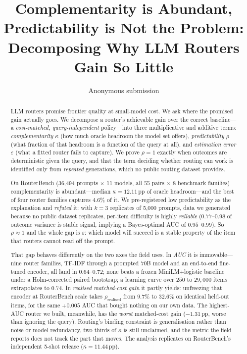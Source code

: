\documentclass[10pt]{article}
\title{\bf Complementarity is Abundant, Predictability is Not the Problem:\\
Decomposing Why LLM Routers Gain So Little}
\author{Anonymous submission}
\date{}
\newcommand{\pp}{\,\text{pp}}
\begin{document}
\maketitle

\begin{abstract}
LLM routers promise frontier quality at small-model cost. We ask where the
promised gain actually goes. We decompose a router's achievable gain over the
correct baseline---a \emph{cost-matched, query-independent} policy---into three
multiplicative and additive terms: \emph{complementarity} $\kappa$ (how much
oracle headroom the model set offers), \emph{predictability} $\rho$ (what
fraction of that headroom is a function of the query at all), and
\emph{estimation error} $\varepsilon$ (what a fitted router fails to capture).
We prove $\rho=1$ exactly when outcomes are deterministic given the query, and
that the term deciding whether routing can work is identified only from
\emph{repeated} generations, which no public routing dataset provides.

On RouterBench (36{,}494 prompts $\times$ 11 models, all 55 pairs $\times$ 8
benchmark families) complementarity is abundant---median $\kappa = 12.11\pp$ of
oracle headroom---and the best of four router families captures $4.6\%$ of it.
We pre-registered low predictability as the explanation and \emph{refuted} it:
with $k=3$ replicates of 5{,}000 prompts, data we generated because no public
dataset replicates, per-item difficulty is highly \emph{reliable}
($0.77$--$0.98$ of outcome variance is stable signal, implying a Bayes-optimal
AUC of $0.95$--$0.99$). So $\rho\approx1$ and the whole gap is $\varepsilon$:
which model will succeed is a stable property of the item that routers cannot
read off the prompt.

That gap behaves differently on the two axes the field uses. In \emph{AUC} it is
immovable---nine router families, TF-IDF through a prompted 70B model and an
end-to-end fine-tuned encoder, all land in $0.64$--$0.72$; none beats a frozen
MiniLM$+$logistic baseline under a Holm-corrected paired bootstrap; a learning
curve over $250$ to $29{,}000$ items extrapolates to $0.74$. In \emph{realised
matched-cost gain} it partly yields: unfreezing that encoder at RouterBench
scale takes $\rho_{\text{realised}}$ from $9.7\%$ to $32.6\%$ on identical
held-out items, for the same $+0.005$ AUC that bought nothing on our own data.
The highest-AUC router we built, meanwhile, has the \emph{worst} matched-cost
gain ($-1.31\pp$, worse than ignoring the query). Routing's binding constraint
is generalisation rather than noise or model redundancy, two thirds of $\kappa$
is still unclaimed, and the metric the field reports does not track the part
that moves. The analysis replicates on RouterBench's independent 5-shot release
($\kappa=11.44\pp$).
\end{abstract}
\end{document}

